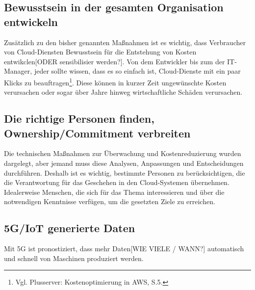 \subsection*{Bewusstsein in der gesamten Organisation entwickeln}
Zusätzlich zu den bisher genannten Maßnahmen ist es wichtig, dass Verbraucher von Cloud-Diensten Bewusstsein für die Entstehung von Kosten entwikclen[ODER sensibilisier werden?]. Von dem Entwickler bis zum der IT-Manager, jeder sollte wissen, dass es so einfach ist, Cloud-Dienste mit ein paar Klicks zu beauftragen\footnote{Vgl. Plusserver: Kostenoptimierung in AWS, S.5\cite{PS1}.}. Diese können in kurzer Zeit ungewünschte  Kosten verursachen oder sogar über Jahre hinweg wirtschaftliche Schäden verursachen. 
\\
\subsection*{Die richtige Personen finden, Ownership/Commitment verbreiten}
Die technischen Maßnahmen zur Überwachung und Kostenreduzierung wurden dargelegt, aber jemand muss diese Analysen, Anpassungen und Entscheidungen durchführen. 
Deshalb ist es wichtig, bestimmte Personen zu berücksichtigen, die die Verantwortung für das Geschehen in den Cloud-Systemen übernehmen. Idealerweise Menschen, die sich für das Thema interessieren und über die notwendigen Kenntnisse verfügen, um die gesetzten Ziele zu erreichen. 
\\
\subsection*{5G/IoT generierte Daten}
Mit 5G ist pronostiziert, dass mehr Daten[WIE VIELE / WANN?] automatisch und schnell von Maschinen produziert werden.
\\
